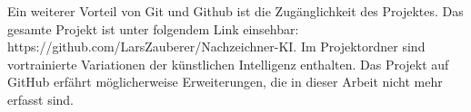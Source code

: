 Ein weiterer Vorteil von Git und Github ist die Zugänglichkeit des Projektes.
Das gesamte Projekt ist unter folgendem Link einsehbar:
https://github.com/LarsZauberer/Nachzeichner-KI. Im Projektordner sind
vortrainierte Variationen der künstlichen Intelligenz enthalten. Das Projekt auf
GitHub erfährt möglicherweise Erweiterungen, die in dieser Arbeit nicht mehr
erfasst sind.
